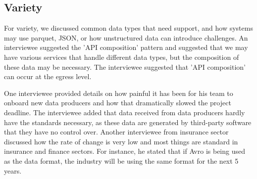 \documentclass[a4paper,11pt,article,oneside]{memoir}
\begin{document}



\subsection{Variety}

For variety, we discussed common data types that need support, and how systems may use parquet, JSON, or how unstructured data can introduce challenges. An interviewee suggested the 'API composition' pattern and suggested that we may have various services that handle different data types, but the composition of these data may be necessary. The interviewee suggested that 'API composition' can occur at the egress level. 

One interviewee provided details on how painful it has been for his team to onboard new data producers and how that dramatically slowed the project deadline. The interviewee added that data received from data producers hardly have the standards necessary, as these data are generated by third-party software that they have no control over. Another interviewee from insurance sector discussed how the rate of change is very low and most things are standard in insurance and finance sectors. For instance, he stated that if Avro is being used as the data format, the industry will be using the same format for the next 5 years. 


\end{document}
